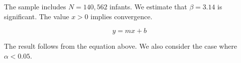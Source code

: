 The sample includes $N = 140{,}562$ infants. We estimate that $\beta = 3.14$ is significant. The value $x > 0$ implies convergence.

\begin{equation}
y = mx + b
\end{equation}

The result follows from the equation above. We also consider the case where $\alpha < 0.05$.
